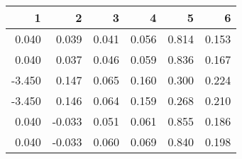 \begin{table}[ht]
\centering
\begin{tabular}{rrrrrr}
  \hline
1 & 2 & 3 & 4 & 5 & 6 \\ 
  \hline
0.040 & 0.039 & 0.041 & 0.056 & 0.814 & 0.153 \\ 
  0.040 & 0.037 & 0.046 & 0.059 & 0.836 & 0.167 \\ 
  -3.450 & 0.147 & 0.065 & 0.160 & 0.300 & 0.224 \\ 
  -3.450 & 0.146 & 0.064 & 0.159 & 0.268 & 0.210 \\ 
  0.040 & -0.033 & 0.051 & 0.061 & 0.855 & 0.186 \\ 
  0.040 & -0.033 & 0.060 & 0.069 & 0.840 & 0.198 \\ 
   \hline
\end{tabular}
\end{table}
